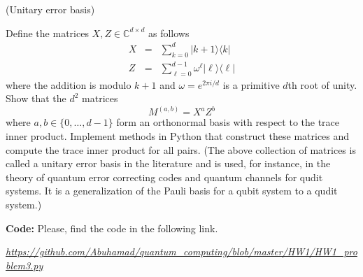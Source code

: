 \documentclass[12pt]{article}
\renewcommand{\>}{\rangle}
\newcommand{\<}{\langle}
\newcommand{\C}{\mathbb{C}}
\begin{document}
\newpage


 (Unitary error basis)

\noindent
Define the matrices $X,Z\in\C^{d\times d}$ as follows
\begin{eqnarray}
X & = & \sum_{k=0}^d |k+1\>\<k| \\
Z & = & \sum_{\ell=0}^{d-1} \omega^\ell |\ell\>\<\ell|
\end{eqnarray}
where the addition is modulo $k+1$ and $\omega=e^{2\pi i/d}$ is a primitive $d$th root of unity. Show that the $d^2$ matrices
\[
M^{(a,b)} = X^a Z^b
\]
where $a,b\in\{0,\ldots, d-1\}$ form an orthonormal basis with respect to the trace inner product. Implement methods in Python that construct these matrices and compute the trace inner product for all pairs. (The above collection of matrices is called a unitary error basis in the literature and is used, for instance, in the theory of quantum error correcting codes and quantum channels for qudit systems. It is a generalization of the Pauli basis for a qubit system to a qudit system.) \newline



\noindent
\textbf{Code:} Please, find the code in the following link.

\noindent
{\small \em \url{https://github.com/Abuhamad/quantum_computing/blob/master/HW1/HW1_problem3.py}}
\end{document}
